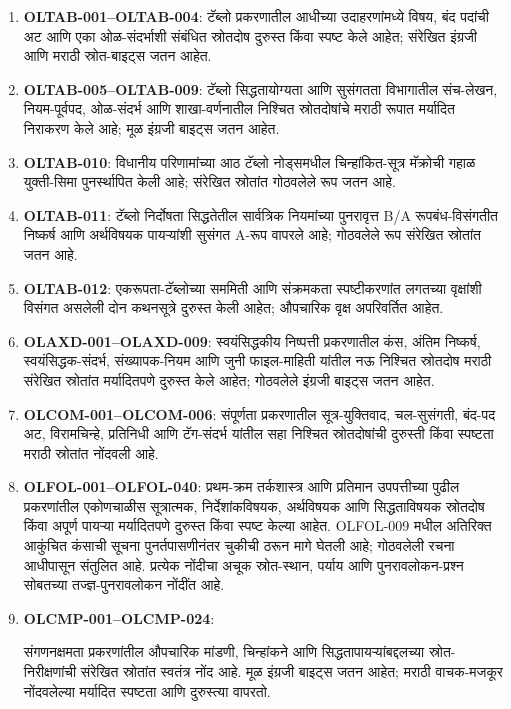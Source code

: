 \begin{enumerate}
\item \textbf{OLTAB-001--OLTAB-004}: टॅब्लो प्रकरणातील आधीच्या
उदाहरणांमध्ये विषय, बंद पदांची अट आणि एका ओळ-संदर्भाशी संबंधित स्रोतदोष
दुरुस्त किंवा स्पष्ट केले आहेत; संरेखित इंग्रजी आणि मराठी स्रोत-बाइट्स जतन आहेत.
\item \textbf{OLTAB-005--OLTAB-009}: टॅब्लो सिद्धतायोग्यता आणि सुसंगतता
विभागातील संच-लेखन, नियम-पूर्वपद, ओळ-संदर्भ आणि शाखा-वर्णनातील निश्चित
स्रोतदोषांचे मराठी रूपात मर्यादित निराकरण केले आहे; मूळ इंग्रजी बाइट्स जतन आहेत.
\item \textbf{OLTAB-010}: विधानीय परिणामांच्या आठ टॅब्लो नोड्समधील
चिन्हांकित-सूत्र मॅक्रोची गहाळ युक्ती-सिमा पुनर्स्थापित केली आहे; संरेखित
स्रोतांत गोठवलेले रूप जतन आहे.
\item \textbf{OLTAB-011}: टॅब्लो निर्दोषता सिद्धतेतील सार्वत्रिक नियमांच्या
पुनरावृत्त B/A रूपबंध-विसंगतीत निष्कर्ष आणि अर्थविषयक पायऱ्यांशी सुसंगत
A-रूप वापरले आहे; गोठवलेले रूप संरेखित स्रोतांत जतन आहे.
\item \textbf{OLTAB-012}: एकरूपता-टॅब्लोच्या सममिती आणि संक्रमकता
स्पष्टीकरणांत लगतच्या वृक्षांशी विसंगत असलेली दोन कथनसूत्रे दुरुस्त केली आहेत;
औपचारिक वृक्ष अपरिवर्तित आहेत.

\item \textbf{OLAXD-001--OLAXD-009}: स्वयंसिद्धकीय निष्पत्ती प्रकरणातील
कंस, अंतिम निष्कर्ष, स्वयंसिद्धक-संदर्भ, संख्यापक-नियम आणि जुनी
फाइल-माहिती यांतील नऊ निश्चित स्रोतदोष मराठी संरेखित स्रोतांत मर्यादितपणे
दुरुस्त केले आहेत; गोठवलेले इंग्रजी बाइट्स जतन आहेत.
\item \textbf{OLCOM-001--OLCOM-006}: संपूर्णता प्रकरणातील सूत्र-युक्तिवाद,
चल-सुसंगती, बंद-पद अट, विरामचिन्हे, प्रतिनिधी आणि टॅग-संदर्भ यांतील सहा
निश्चित स्रोतदोषांची दुरुस्ती किंवा स्पष्टता मराठी स्रोतांत नोंदवली आहे.
 \item \textbf{OLFOL-001--OLFOL-040}: प्रथम-क्रम तर्कशास्त्र आणि प्रतिमान
उपपत्तीच्या पुढील प्रकरणांतील एकोणचाळीस सूत्रात्मक, निर्देशांकविषयक,
अर्थविषयक आणि सिद्धताविषयक स्रोतदोष किंवा अपूर्ण पायऱ्या मर्यादितपणे
दुरुस्त किंवा स्पष्ट केल्या आहेत. OLFOL-009 मधील अतिरिक्त आकुंचित कंसाची
सूचना पुनर्तपासणीनंतर चुकीची ठरून मागे घेतली आहे; गोठवलेली रचना आधीपासून
संतुलित आहे. प्रत्येक नोंदीचा अचूक स्रोत-स्थान, पर्याय आणि
पुनरावलोकन-प्रश्न सोबतच्या तज्ज्ञ-पुनरावलोकन नोंदींत आहे.

\item \textbf{OLCMP-001--OLCMP-024}:\par संगणनक्षमता प्रकरणांतील औपचारिक
मांडणी, चिन्हांकने आणि सिद्धतापायऱ्यांबद्दलच्या स्रोत-निरीक्षणांची संरेखित
स्रोतांत स्वतंत्र नोंद आहे. मूळ इंग्रजी बाइट्स जतन आहेत; मराठी वाचक-मजकूर
नोंदवलेल्या मर्यादित स्पष्टता आणि दुरुस्त्या वापरतो.


\end{enumerate}
